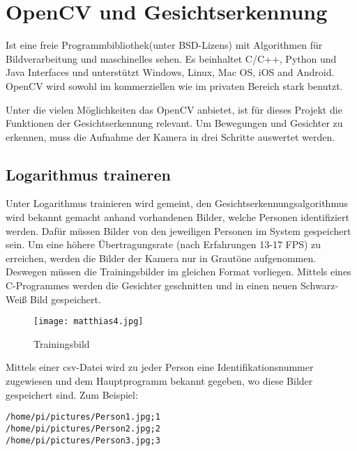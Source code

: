 \section{OpenCV und Gesichtserkennung}

Ist eine freie Programmbibliothek(unter BSD-Lizens) mit Algorithmen für Bildverarbeitung und maschinelles sehen. Es beinhaltet C/C++, Python und Java Interfaces und unterstützt Windows, Linux, Mac OS, iOS and Android. OpenCV wird sowohl im kommerziellen wie im privaten Bereich stark benutzt.\cite{bib.opencv} %

Unter die vielen Möglichkeiten das OpenCV anbietet, ist für dieses Projekt die Funktionen der Gesichtserkennung relevant. Um Bewegungen und Gesichter zu erkennen, muss die Aufnahme der Kamera in drei Schritte auswertet werden. 


\subsection{Logarithmus traineren}
Unter Logarithmus trainieren wird gemeint, den Gesichtserkennungsalgorithmus wird bekannt gemacht anhand vorhandenen Bilder, welche Personen identifiziert werden. Dafür müssen Bilder von den jeweiligen Personen im System gespeichert sein. Um eine höhere Übertragungsrate (nach Erfahrungen 13-17 FPS) zu erreichen, werden die Bilder der Kamera nur in Grautöne aufgenommen. Deswegen müssen die Trainingsbilder im gleichen Format vorliegen. Mittels eines C-Programmes werden die Gesichter geschnitten und in einen neuen Schwarz-Weiß Bild gespeichert.\\

\begin{figure}[h]
  \begin{center}		%
    \texttt{[image: matthias4.jpg]}
  		  \caption{Trainingsbild}
     \label{Trainingsbild}
  \end{center}
\end{figure}

Mittels einer csv-Datei wird zu jeder Person eine Identifikationsnummer zugewiesen und dem Hauptprogramm bekannt gegeben, wo diese Bilder gespeichert sind. Zum Beispiel:\\

\begin{lstlisting}
/home/pi/pictures/Person1.jpg;1
/home/pi/pictures/Person2.jpg;2
/home/pi/pictures/Person3.jpg;3
\end{lstlisting}

